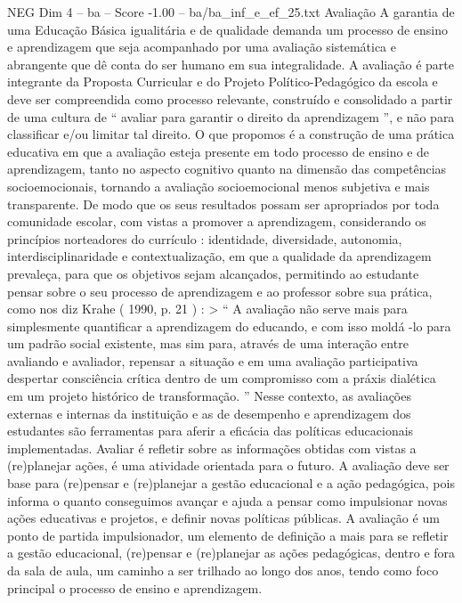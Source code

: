 \begin{textsample}{NEG Dim 4 – ba – Score -1.00 – ba/ba\_inf\_e\_ef\_25.txt}  \label{ex:f4_neg_264}
Avaliação A garantia de uma Educação Básica igualitária e de qualidade demanda um processo de ensino e aprendizagem que seja acompanhado por uma avaliação sistemática e abrangente que dê conta do ser humano em sua integralidade.
A avaliação é parte integrante da Proposta Curricular e do Projeto Político-Pedagógico da escola e deve ser compreendida como processo relevante, construído e consolidado a partir de uma cultura de “ avaliar para garantir o direito da aprendizagem ”, e não para classificar e/ou limitar tal direito.
O que propomos é a construção de uma prática educativa em que a avaliação esteja presente em todo processo de ensino e de aprendizagem, tanto no aspecto cognitivo quanto na dimensão das competências socioemocionais, tornando a avaliação socioemocional menos subjetiva e mais transparente.
De modo que os seus resultados possam ser apropriados por toda comunidade escolar, com vistas a promover a aprendizagem, considerando os princípios norteadores do currículo : identidade, diversidade, autonomia, interdisciplinaridade e contextualização, em que a qualidade da aprendizagem prevaleça, para que os objetivos sejam alcançados, permitindo ao estudante pensar sobre o seu processo de aprendizagem e ao professor sobre sua prática, como nos diz Krahe ( 1990, p. 21 ) : > “ A avaliação não serve mais para simplesmente quantificar a aprendizagem do educando, e com isso moldá -lo para um padrão social existente, mas sim para, através de uma interação entre avaliando e avaliador, repensar a situação e em uma avaliação participativa despertar consciência crítica dentro de um compromisso com a práxis dialética em um projeto histórico de transformação. ” Nesse contexto, as avaliações externas e internas da instituição e as de desempenho e aprendizagem dos estudantes são ferramentas para aferir a eficácia das políticas educacionais implementadas.
Avaliar é refletir sobre as informações obtidas com vistas a (re)planejar ações, é uma atividade orientada para o futuro.
A avaliação deve ser base para (re)pensar e (re)planejar a gestão educacional e a ação pedagógica, pois informa o quanto conseguimos avançar e ajuda a pensar como impulsionar novas ações educativas e projetos, e definir novas políticas públicas.
A avaliação é um ponto de partida impulsionador, um elemento de definição a mais para se refletir a gestão educacional, (re)pensar e (re)planejar as ações pedagógicas, dentro e fora da sala de aula, um caminho a ser trilhado ao longo dos anos, tendo como foco principal o processo de ensino e aprendizagem.

\end{textsample}
